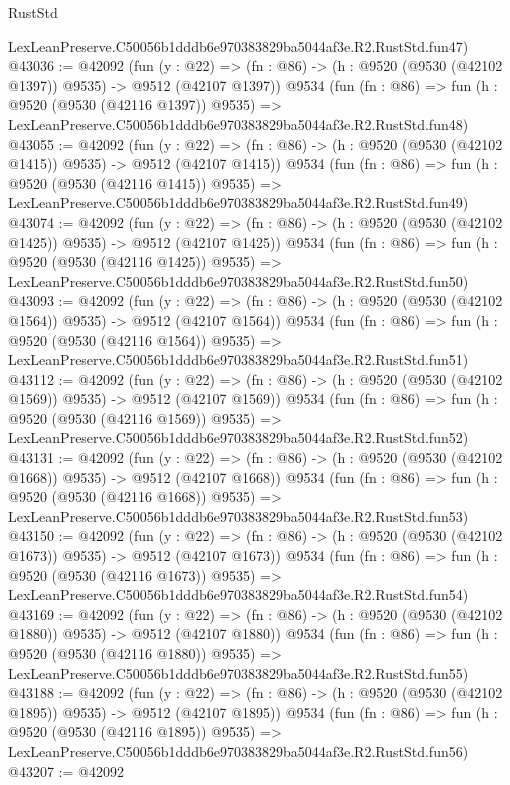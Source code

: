 \begin{lexlean}{RustStd}
\begin{coremodule}
    LexLeanPreserve.C50056b1dddb6e970383829ba5044af3e.R2.RustStd.fun47)
@43036 := @42092
    (fun (y : @22) =>
    (fn : @86) -> (h : @9520 (@9530 (@42102 @1397)) @9535) -> @9512 (@42107 @1397))
    @9534
    (fun (fn : @86) =>
    fun (h : @9520 (@9530 (@42116 @1397)) @9535) =>
    LexLeanPreserve.C50056b1dddb6e970383829ba5044af3e.R2.RustStd.fun48)
@43055 := @42092
    (fun (y : @22) =>
    (fn : @86) -> (h : @9520 (@9530 (@42102 @1415)) @9535) -> @9512 (@42107 @1415))
    @9534
    (fun (fn : @86) =>
    fun (h : @9520 (@9530 (@42116 @1415)) @9535) =>
    LexLeanPreserve.C50056b1dddb6e970383829ba5044af3e.R2.RustStd.fun49)
@43074 := @42092
    (fun (y : @22) =>
    (fn : @86) -> (h : @9520 (@9530 (@42102 @1425)) @9535) -> @9512 (@42107 @1425))
    @9534
    (fun (fn : @86) =>
    fun (h : @9520 (@9530 (@42116 @1425)) @9535) =>
    LexLeanPreserve.C50056b1dddb6e970383829ba5044af3e.R2.RustStd.fun50)
@43093 := @42092
    (fun (y : @22) =>
    (fn : @86) -> (h : @9520 (@9530 (@42102 @1564)) @9535) -> @9512 (@42107 @1564))
    @9534
    (fun (fn : @86) =>
    fun (h : @9520 (@9530 (@42116 @1564)) @9535) =>
    LexLeanPreserve.C50056b1dddb6e970383829ba5044af3e.R2.RustStd.fun51)
@43112 := @42092
    (fun (y : @22) =>
    (fn : @86) -> (h : @9520 (@9530 (@42102 @1569)) @9535) -> @9512 (@42107 @1569))
    @9534
    (fun (fn : @86) =>
    fun (h : @9520 (@9530 (@42116 @1569)) @9535) =>
    LexLeanPreserve.C50056b1dddb6e970383829ba5044af3e.R2.RustStd.fun52)
@43131 := @42092
    (fun (y : @22) =>
    (fn : @86) -> (h : @9520 (@9530 (@42102 @1668)) @9535) -> @9512 (@42107 @1668))
    @9534
    (fun (fn : @86) =>
    fun (h : @9520 (@9530 (@42116 @1668)) @9535) =>
    LexLeanPreserve.C50056b1dddb6e970383829ba5044af3e.R2.RustStd.fun53)
@43150 := @42092
    (fun (y : @22) =>
    (fn : @86) -> (h : @9520 (@9530 (@42102 @1673)) @9535) -> @9512 (@42107 @1673))
    @9534
    (fun (fn : @86) =>
    fun (h : @9520 (@9530 (@42116 @1673)) @9535) =>
    LexLeanPreserve.C50056b1dddb6e970383829ba5044af3e.R2.RustStd.fun54)
@43169 := @42092
    (fun (y : @22) =>
    (fn : @86) -> (h : @9520 (@9530 (@42102 @1880)) @9535) -> @9512 (@42107 @1880))
    @9534
    (fun (fn : @86) =>
    fun (h : @9520 (@9530 (@42116 @1880)) @9535) =>
    LexLeanPreserve.C50056b1dddb6e970383829ba5044af3e.R2.RustStd.fun55)
@43188 := @42092
    (fun (y : @22) =>
    (fn : @86) -> (h : @9520 (@9530 (@42102 @1895)) @9535) -> @9512 (@42107 @1895))
    @9534
    (fun (fn : @86) =>
    fun (h : @9520 (@9530 (@42116 @1895)) @9535) =>
    LexLeanPreserve.C50056b1dddb6e970383829ba5044af3e.R2.RustStd.fun56)
@43207 := @42092

\end{coremodule}
\end{lexlean}
